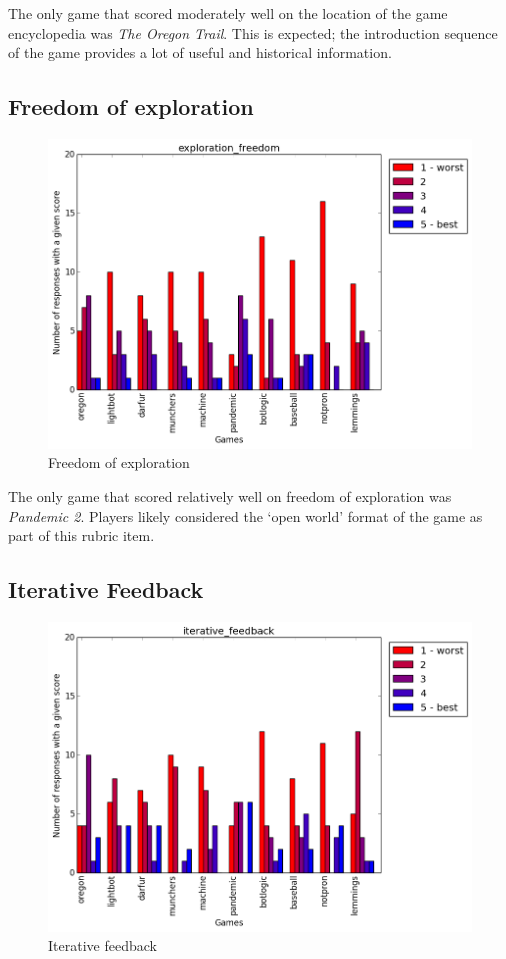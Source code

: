 				The only game that scored moderately well on the location of the game encyclopedia was \textit{The Oregon Trail}. This is expected; the introduction sequence of the game provides a lot of useful and historical information.

			\subsection{Freedom of exploration}
				\begin{figure}[] 
				\centering 
				\includegraphics[width=\textwidth, height=.4\textheight, keepaspectratio=true]{exploration_freedom_scores.png} 
				\caption{Freedom of exploration}
				\end{figure}

				The only game that scored relatively well on freedom of exploration was \textit{Pandemic 2}. Players likely considered the `open world' format of the game as part of this rubric item.

			\subsection{Iterative Feedback}
				\begin{figure}[] 
				\centering 
				\includegraphics[width=\textwidth, height=.4\textheight, keepaspectratio=true]{iterative_feedback_scores.png} 
				\caption{Iterative feedback}
				\end{figure}

